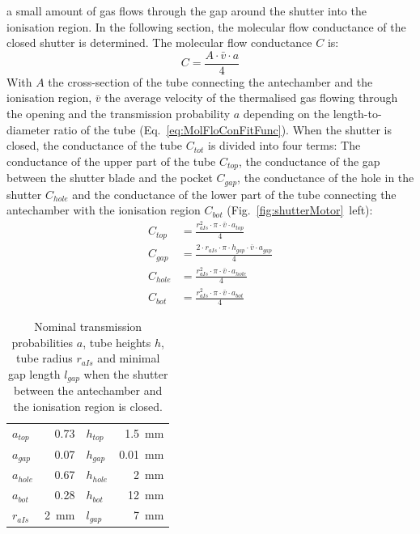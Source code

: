 	a small amount of gas flows through the gap around the shutter into the ionisation region. In the following section, the molecular flow conductance of the closed shutter is determined. The molecular flow conductance $C$ is:
	\begin{equation}
		C = \frac{A\cdot\bar{v}\cdot a}{4}
	\end{equation}
	With $A$ the cross-section of the tube connecting the antechamber and the ionisation region, $\bar{v}$ the average velocity of the thermalised gas flowing through the opening and the transmission probability $a$ depending on the length-to-diameter ratio of the tube (Eq.~\eqref{eq:MolFloConFitFunc}). When the shutter is closed, the conductance of the tube $C_{tot}$ is divided into four terms: The conductance of the upper part of the tube $C_{top}$, the conductance of the gap between the shutter blade and the pocket $C_{gap}$, the conductance of the hole in the shutter $C_{hole}$ and the conductance of the lower part of the tube connecting the antechamber with the ionisation region $C_{bot}$ (Fig.~\ref{fig:shutterMotor}~left):
	\begin{align}
		C_{top}  &= \frac{r_{aIs}^2\cdot\pi\cdot\bar{v}\cdot a_{top}}{4}\\
		C_{gap}  &= \frac{2\cdot r_{aIs}\cdot \pi \cdot h_{gap}\cdot\bar{v}\cdot a_{gap}}{4}\\
		C_{hole} &= \frac{r_{aIs}^2\cdot\pi\cdot\bar{v}\cdot a_{hole}}{4}\\
		C_{bot}  &= \frac{r_{aIs}^2\cdot\pi\cdot\bar{v}\cdot a_{bot}}{4}
	\end{align}
	\begin{table}[H]
		\begin{center}
			\begin{tabular}{|l r| l r| }
				\hline
				$a_{top}$	& 0.73 	& $h_{top}$		& 1.5~mm	\\
				$a_{gap}$	& 0.07 	& $h_{gap}$		& 0.01~mm \\
				$a_{hole}$ 	& 0.67 	& $h_{hole}$ 	& 2~mm\\
				$a_{bot}$ 	& 0.28 	& $h_{bot}$ 	& 12~mm\\
				$r_{aIs}$ 	& 2~mm & $l_{gap}$ 	& 7~mm\\
				\hline
			\end{tabular}
		\end{center}
		\caption{Nominal transmission probabilities $a$, tube heights $h$, tube radius $r_{aIs}$ and minimal gap length $l_{gap}$ when the shutter between the antechamber and the ionisation region is closed.}
		\label{tab:thMolFloConMotClosPara}
	\end{table}
